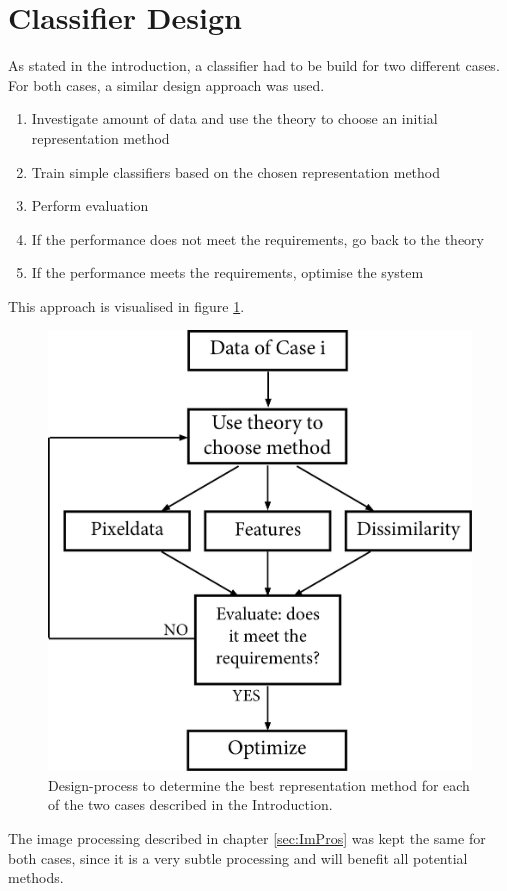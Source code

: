 \section{Classifier Design}
\label{sec:ClasDes}
As stated in the introduction, a classifier had to be build for two different cases. For both cases, a similar design approach was used. \begin{enumerate}
	\item Investigate amount of data and use the theory to choose an initial representation method
	\item Train simple classifiers based on the chosen representation method
	\item Perform evaluation
	\item If the performance does not meet the requirements, go back to the theory
	\item If the performance meets the requirements, optimise the system
\end{enumerate}
This approach is visualised in figure \ref{fig:case_design}.
\begin{figure}[H]
	\centering
	\includegraphics[scale=0.55]{images/Case_Design.jpg}
	\caption{Design-process to determine the best representation method for each of the two cases described in the Introduction.}
	\label{fig:case_design}
\end{figure}
\noindent The image processing described in chapter \ref{sec:ImPros} was kept the same for both cases, since it is a very subtle processing and will benefit all potential methods.

